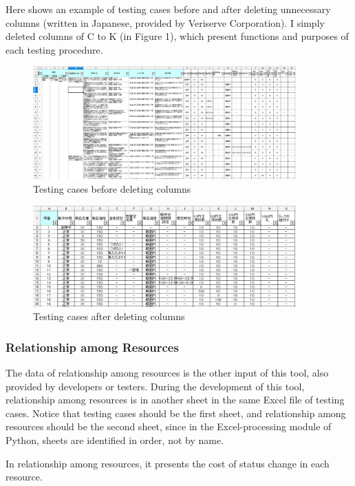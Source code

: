 \documentclass[12pt,a4paper]{article}
\begin{document}
Here shows an example of testing cases before and after deleting unnecessary columns (written in Japanese, provided by Veriserve Corporation). I simply deleted columns of C to K (in Figure 1), which present functions and purposes of each testing procedure.

\begin{figure}[H]
\centering
\includegraphics[width=0.9\textwidth]{testcases_bfdl.PNG}
\caption{Testing cases before deleting columns}
\end{figure}

\begin{figure}[H]
\centering
\includegraphics[width=0.9\textwidth]{testcases_afdl.PNG}
\caption{Testing cases after deleting columns}
\end{figure}

\subsubsection{Relationship among Resources}

The data of relationship among resources is the other input of this tool, also provided by developers or testers. During the development of this tool, relationship among resources is in another sheet in the same Excel file of testing cases. Notice that testing cases should be the first sheet, and relationship among resources should be the second sheet, since in the Excel-processing module of Python, sheets are identified in order, not by name.

In relationship among resources, it presents the cost of status change in each resource.
\end{document}
